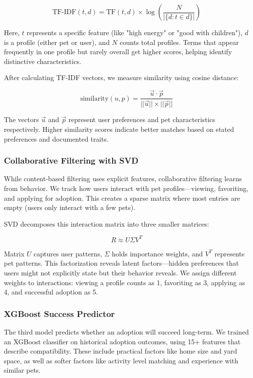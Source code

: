 \documentclass[conference]{IEEEtran}
\begin{document}
\begin{equation}
\text{TF-IDF}(t,d) = \text{TF}(t,d) \times \log\left(\frac{N}{|\{d : t \in d\}|}\right)
\end{equation}

Here, $t$ represents a specific feature (like "high energy" or "good with children"), $d$ is a profile (either pet or user), and $N$ counts total profiles. Terms that appear frequently in one profile but rarely overall get higher scores, helping identify distinctive characteristics.

After calculating TF-IDF vectors, we measure similarity using cosine distance:

\begin{equation}
\text{similarity}(u,p) = \frac{\vec{u} \cdot \vec{p}}{||\vec{u}|| \times ||\vec{p}||}
\end{equation}

The vectors $\vec{u}$ and $\vec{p}$ represent user preferences and pet characteristics respectively. Higher similarity scores indicate better matches based on stated preferences and documented traits.

\subsubsection{Collaborative Filtering with SVD}
While content-based filtering uses explicit features, collaborative filtering learns from behavior. We track how users interact with pet profiles—viewing, favoriting, and applying for adoption. This creates a sparse matrix where most entries are empty (users only interact with a few pets).

SVD decomposes this interaction matrix into three smaller matrices:

\begin{equation}
R \approx U \Sigma V^T
\end{equation}

Matrix $U$ captures user patterns, $\Sigma$ holds importance weights, and $V^T$ represents pet patterns. This factorization reveals latent factors—hidden preferences that users might not explicitly state but their behavior reveals. We assign different weights to interactions: viewing a profile counts as 1, favoriting as 3, applying as 4, and successful adoption as 5.

\subsubsection{XGBoost Success Predictor}
The third model predicts whether an adoption will succeed long-term. We trained an XGBoost classifier on historical adoption outcomes, using 15+ features that describe compatibility. These include practical factors like home size and yard space, as well as softer factors like activity level matching and experience with similar pets.
\end{document}
